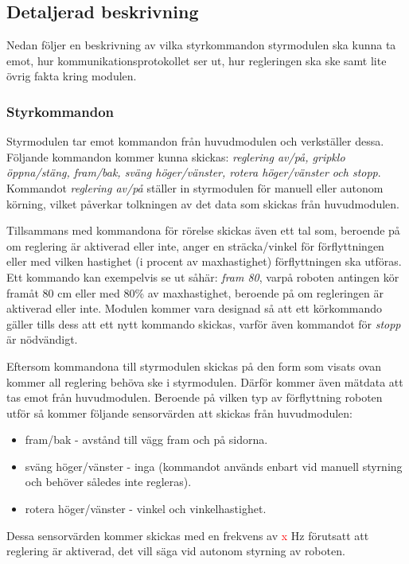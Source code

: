 \documentclass[11pt]{article}
\begin{document}
\begin{flushleft}
\subsection{Detaljerad beskrivning}
Nedan följer en beskrivning av vilka styrkommandon styrmodulen ska kunna ta emot, hur kommunikationsprotokollet ser ut, hur regleringen ska ske samt lite övrig fakta kring modulen.

\subsubsection{Styrkommandon}\label{Styrkommandon}
Styrmodulen tar emot kommandon från huvudmodulen och verkställer dessa. Följande kommandon kommer kunna skickas: \textit{reglering av/på, gripklo öppna/stäng, fram/bak, sväng höger/vänster, rotera höger/vänster och stopp}. Kommandot \textit{reglering av/på} ställer in styrmodulen för manuell eller autonom körning, vilket påverkar tolkningen av det data som skickas från huvudmodulen.

Tillsammans med kommandona för rörelse skickas även ett tal som, beroende på om reglering är aktiverad eller inte, anger en sträcka/vinkel för förflyttningen eller med vilken hastighet (i procent av maxhastighet) förflyttningen ska utföras. Ett kommando kan exempelvis se ut såhär: \textit{fram 80}, varpå roboten antingen kör framåt 80 cm eller med 80\% av maxhastighet, beroende på om regleringen är aktiverad eller inte. Modulen kommer vara designad så att ett körkommando gäller tills dess att ett nytt kommando skickas, varför även kommandot för \textit{stopp} är nödvändigt.

Eftersom kommandona till styrmodulen skickas på den form som visats ovan kommer all reglering behöva ske i styrmodulen. Därför kommer även mätdata att tas emot från huvudmodulen. Beroende på vilken typ av förflyttning roboten utför så kommer följande sensorvärden att skickas från huvudmodulen:
\begin{itemize}
	\item fram/bak - avstånd till vägg fram och på sidorna.
	\item sväng höger/vänster - inga (kommandot används enbart vid manuell styrning och behöver således inte regleras).
	\item rotera höger/vänster - vinkel och vinkelhastighet.
\end{itemize}
Dessa sensorvärden kommer skickas med en frekvens av \textcolor{red}{x} Hz förutsatt att reglering är aktiverad, det vill säga vid autonom styrning av roboten.


\end{flushleft}
\end{document}

